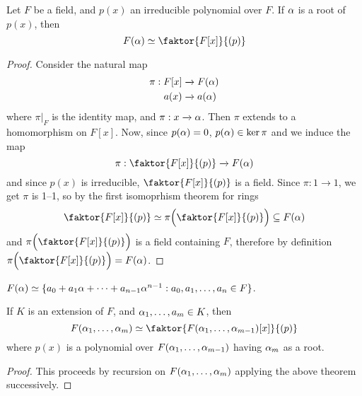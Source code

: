 \begin{theorem}\label{theorem_8.1.8}
  Let $F$ be a field, and $p(x)$ an irreducible polynomial over $F$.
  If $\alpha$ is a root of $p(x)$, then
  \begin{equation*}
    F(\a) \simeq \faktor{F[x]}{(p)}
  \end{equation*}
\end{theorem}
\begin{proof}
  Consider the natural map
  \begin{align*}
    \pi: F[x] & \xrightarrow{} F(\alpha)  \\
      a(x)  & \xrightarrow{} a(\alpha)  \\
  \end{align*}
  where $\pi|_F$ is the identity map, and  $\pi:x \xrightarrow{} \alpha$.
  Then $\pi$ extends to a homomorphism on $F[x]$. Now, since
  $p(\alpha)=0$, $p(\alpha) \in \ker{\pi}$ and we induce the map
  \begin{equation*}
    \pi:\faktor{F[x]}{(p)} \xrightarrow{} F(\a)
  \end{equation*}
  and since $p(x)$ is irreducible, $\faktor{F[x]}{(p)}$ is a field.
  Since $\pi:1 \xrightarrow{} 1$, we get $\pi$ is 1--1, so by the
  first isomoprhism theorem for rings
  \begin{equation*}
    \faktor{F[x]}{(p)} \simeq \pi\Big{(}\faktor{F[x]}{(p)}\Big{)} \subseteq F(\a)
  \end{equation*}
  and $\pi\Big{(}\faktor{F[x]}{(p)}\Big{)}$ is a field containing $F$, therefore
  by definition $\pi\Big{(}\faktor{F[x]}{(p)}\Big{)}=F(\a)$.
\end{proof}
\begin{corollary}
  $F(\alpha) \simeq \{a_0+a_1\alpha+\dots+a_{n-1}\alpha^{n-1}: a_0,a_1, \dots, a_n
  \in F\}$.
\end{corollary}
\begin{corollary}
  If $K$ is an extension of $F$, and  $\alpha_1, \dots, a_m \in K$, then
  \begin{equation*}
    F(\a_1, \dots, \a_m) \simeq \faktor{F(\a_1, \dots, \a_{m-1})[x]}{(p)}
  \end{equation*}
  where $p(x)$ is a polynomial over $F(\alpha_1, \dots, \alpha_{m-1})$ having
  $\alpha_m$ as a root.
\end{corollary}
\begin{proof}
  This proceeds by recursion on $F(\alpha_1, \dots, \alpha_m)$ applying the
  above theorem successively.
\end{proof}

